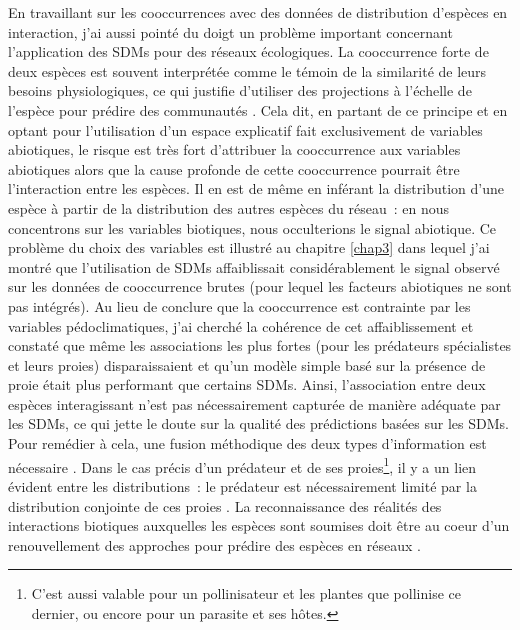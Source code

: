En travaillant sur les cooccurrences avec des données de distribution
d'espèces en interaction, j'ai aussi pointé du doigt un problème
important concernant l'application des SDMs pour des réseaux
écologiques. La cooccurrence forte de deux espèces est souvent
interprétée comme le témoin de la similarité de leurs besoins
physiologiques, ce qui justifie d'utiliser des projections à l'échelle
de l'espèce pour prédire des communautés
\citep{Rehfeldt2006, Albouy2012}. Cela dit, en partant de ce principe et
en optant pour l'utilisation d'un espace explicatif fait exclusivement
de variables abiotiques, le risque est très fort d'attribuer la
cooccurrence aux variables abiotiques alors que la cause profonde de
cette cooccurrence pourrait être l'interaction entre les espèces. Il en
est de même en inférant la distribution d'une espèce à partir de la
distribution des autres espèces du réseau~: en nous concentrons sur les
variables biotiques, nous occulterions le signal abiotique. Ce problème
du choix des variables est illustré au chapitre \ref{chap3} dans lequel
j'ai montré que l'utilisation de SDMs affaiblissait considérablement le
signal observé sur les données de cooccurrence brutes (pour lequel les
facteurs abiotiques ne sont pas intégrés). Au lieu de conclure que la
cooccurrence est contrainte par les variables pédoclimatiques, j'ai
cherché la cohérence de cet affaiblissement et constaté que même les
associations les plus fortes (pour les prédateurs spécialistes et leurs
proies) disparaissaient et qu'un modèle simple basé sur la présence de
proie était plus performant que certains SDMs. Ainsi, l'association
entre deux espèces interagissant n'est pas nécessairement capturée de
manière adéquate par les SDMs, ce qui jette le doute sur la qualité des
prédictions basées sur les SDMs. Pour remédier à cela, une fusion
méthodique des deux types d'information est nécessaire
\citep{Meier2010, Thuiller2013}. Dans le cas précis d'un prédateur et de
ses proies\footnote{C'est aussi valable pour un pollinisateur et les
  plantes que pollinise ce dernier, ou encore pour un parasite et ses
  hôtes.}, il y a un lien évident entre les distributions~: le prédateur
est nécessairement limité par la distribution conjointe de ces proies
\citep{Holt2009, Shenbrot2007}. La reconnaissance des réalités des
interactions biotiques auxquelles les espèces sont soumises doit être au
coeur d'un renouvellement des approches pour prédire des espèces en
réseaux \citep{Godsoe2015}.

